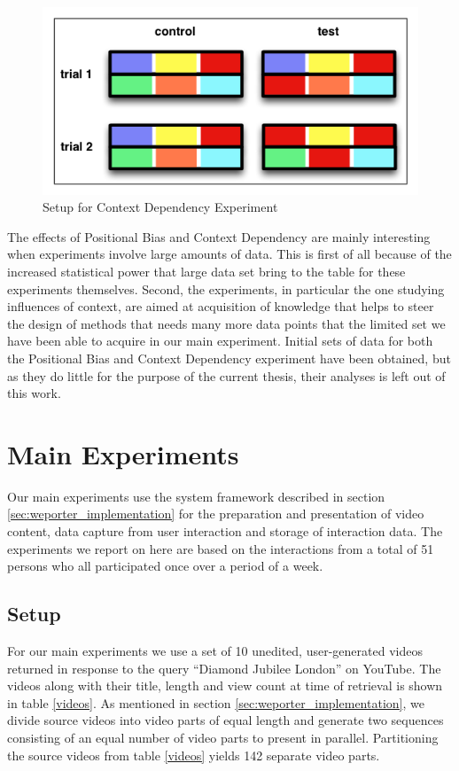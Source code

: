 \begin{figure}[htbp]
  \centering
    \includegraphics[width = .5\textwidth]{img/exp_context}
  \caption{Setup for Context Dependency Experiment}
  \label{fig:exp_context}
\end{figure}


The effects of Positional Bias and Context Dependency are mainly interesting when experiments involve large amounts of data. This is first of all because of the increased statistical power that large data set bring to the table for these experiments themselves. Second, the experiments, in particular the one studying influences of context, are aimed at acquisition of knowledge that helps to steer the design of methods that needs many more data points that the limited set we have been able to acquire in our main experiment. Initial sets of data for both the Positional Bias and Context Dependency experiment have been obtained, but as they do little for the purpose of the current thesis, their analyses is left out of this work.

\section{Main Experiments} %
\label{sec:main_experiments}

Our main experiments use the system framework described in section \ref{sec:weporter_implementation} for the preparation and presentation of video content, data capture from user interaction and storage of interaction data. The experiments we report on here are based on the interactions from a total of 51 persons who all participated once over a period of a week.

\subsection{Setup}
For our main experiments we use a set of 10 unedited, user-generated videos returned in response to the query ``Diamond Jubilee London'' on YouTube. The videos along with their title, length and view count at time of retrieval is shown in table \ref{videos}. As mentioned in section \ref{sec:weporter_implementation}, we divide source videos into video parts of equal length and generate two sequences consisting of an equal number of video parts to present in parallel. Partitioning the source videos from table \ref{videos} yields 142 separate video parts.

